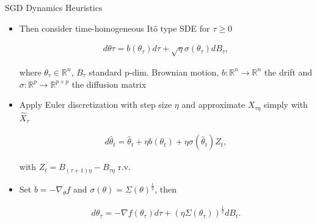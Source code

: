 \documentclass[fleqn]{beamer}
\begin{document}
    \begin{frame}{SGD Dynamics Heuristics}
        \begin{itemize}[<+->]
            \item Then consider  time-homogeneous It\^o type SDE for $\tau\ge 0$
            \begin{center}
            \begin{minipage}{0.5\textwidth}
                \begin{align*}
                    d\theta\tau = b(\theta_\tau)d\tau
                    +\sqrt{\eta}\sigma(\theta_\tau)dB_\tau,
                \end{align*}
            \end{minipage}
            \end{center}
            where $\theta_\tau \in \mathbb{R}^{n}$, $B_\tau$ standard p-dim.
            Brownian
            motion, $b:\mathbb{R}^{n} \to \mathbb{R}^{n}$ the drift and
            $\sigma: \mathbb{R}^{p}\to \mathbb{R}^{p\times p}$ the diffusion
            matrix

        \item Apply Euler discretization with step size $\eta$ and
            approximate $X_{\tau \eta}$ simply with $\hat{X}_{\tau}$
            \begin{center}
            \begin{minipage}{0.5\textwidth}
                \begin{align*}
                    d\hat{\theta}_t= \hat{\theta}_t + \eta b(\theta_t)
                    +\eta \sigma(\hat{\theta}_t)Z_t,
                \end{align*}
            \end{minipage}
            \end{center}
            with $Z_t = B_{(\tau+1)\eta} - B_{\tau\eta}$ r.v.

        \item Set $b = -\nabla_\theta f$ and $\sigma(\theta) =
            \Sigma(\theta)^{\frac{1}{2}}$, then
            \begin{center}
            \begin{minipage}{0.5\textwidth}
                \begin{align*}
                    d\theta_\tau = -\nabla f(\theta_\tau)d\tau
                    + (\eta\Sigma(\theta_\tau))^{\frac{1}{2}} dB_t.
                \end{align*}
            \end{minipage}
            \end{center}
        \end{itemize}
    \end{frame}
\end{document}
